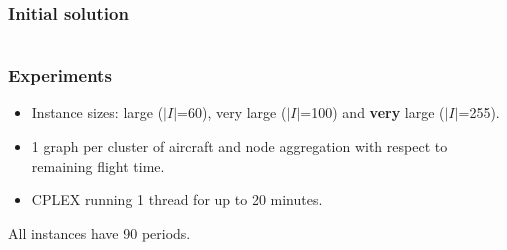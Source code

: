 \begin{frame}[t]
\frametitle{\textbf{Initial solution}}

  \begin{columns}[T]
    \begin{itemize}
    \end{itemize}

    
  \end{columns}


\end{frame}

\begin{frame}
\frametitle{\textbf{Experiments}}
  
  \begin{itemize}
    \item Instance sizes: large ($|I|$=60), very large ($|I|$=100) and \textbf{very} large ($|I|$=255).
    \item 1 graph per cluster of aircraft and node aggregation with respect to remaining flight time.
    \item CPLEX running 1 thread for up to 20 minutes.
  \end{itemize}
  All instances have 90 periods.
\end{frame}

